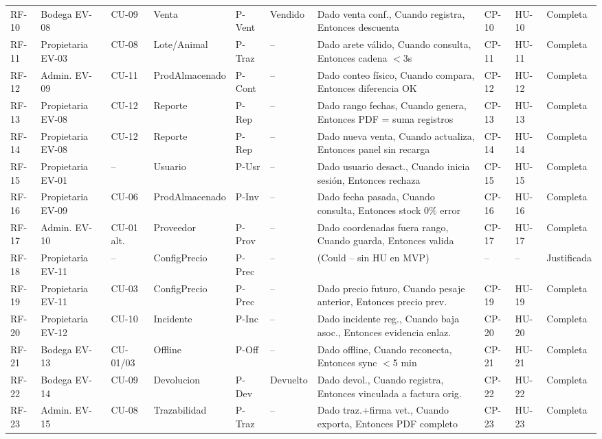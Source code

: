 \documentclass[11pt,a4paper]{article}
\begin{document}
\begin{longtable}{|p{0.5cm}|p{1.4cm}|p{0.8cm}|p{2cm}|p{1.3cm}|p{1.3cm}|p{2.3cm}|p{0.8cm}|p{1.0cm}|p{1.1cm}|}
RF-10 & Bodega EV-08 & CU-09 & Venta & P-Vent & Vendido & Dado venta conf., Cuando registra, Entonces descuenta & CP-10 & HU-10 & Completa \\
RF-11 & Propietaria EV-03 & CU-08 & Lote/Animal & P-Traz & -- & Dado arete válido, Cuando consulta, Entonces cadena $<$3s & CP-11 & HU-11 & Completa \\
RF-12 & Admin. EV-09 & CU-11 & ProdAlmacenado & P-Cont & -- & Dado conteo físico, Cuando compara, Entonces diferencia OK & CP-12 & HU-12 & Completa \\
RF-13 & Propietaria EV-08 & CU-12 & Reporte & P-Rep & -- & Dado rango fechas, Cuando genera, Entonces PDF = suma registros & CP-13 & HU-13 & Completa \\
RF-14 & Propietaria EV-08 & CU-12 & Reporte & P-Rep & -- & Dado nueva venta, Cuando actualiza, Entonces panel sin recarga & CP-14 & HU-14 & Completa \\
RF-15 & Propietaria EV-01 & -- & Usuario & P-Usr & -- & Dado usuario desact., Cuando inicia sesión, Entonces rechaza & CP-15 & HU-15 & Completa \\
RF-16 & Propietaria EV-09 & CU-06 & ProdAlmacenado & P-Inv & -- & Dado fecha pasada, Cuando consulta, Entonces stock 0\% error & CP-16 & HU-16 & Completa \\
RF-17 & Admin. EV-10 & CU-01 alt. & Proveedor & P-Prov & -- & Dado coordenadas fuera rango, Cuando guarda, Entonces valida & CP-17 & HU-17 & Completa \\
RF-18 & Propietaria EV-11 & -- & ConfigPrecio & P-Prec & -- & (Could -- sin HU en MVP) & -- & -- & Justificada \\
RF-19 & Propietaria EV-11 & CU-03 & ConfigPrecio & P-Prec & -- & Dado precio futuro, Cuando pesaje anterior, Entonces precio prev. & CP-19 & HU-19 & Completa \\
RF-20 & Propietaria EV-12 & CU-10 & Incidente & P-Inc & -- & Dado incidente reg., Cuando baja asoc., Entonces evidencia enlaz. & CP-20 & HU-20 & Completa \\
RF-21 & Bodega EV-13 & CU-01/03 & Offline & P-Off & -- & Dado offline, Cuando reconecta, Entonces sync $<$5 min & CP-21 & HU-21 & Completa \\
RF-22 & Bodega EV-14 & CU-09 & Devolucion & P-Dev & Devuelto & Dado devol., Cuando registra, Entonces vinculada a factura orig. & CP-22 & HU-22 & Completa \\
RF-23 & Admin. EV-15 & CU-08 & Trazabilidad & P-Traz & -- & Dado traz.+firma vet., Cuando exporta, Entonces PDF completo & CP-23 & HU-23 & Completa \\

\end{longtable}
\end{document}
